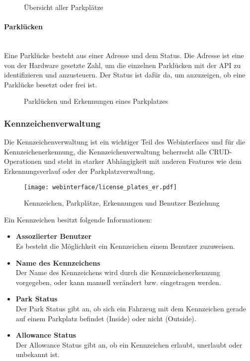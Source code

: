 \begin{figure}[H]
  \centering
  \caption{Übersicht aller Parkplätze}
\end{figure}

\paragraph{Parklücken}\mbox{}\\
Eine Parklücke besteht aus einer Adresse und dem Status. Die Adresse ist eine
von der Hardware gesetzte Zahl, um die einzelnen Parklücken mit der API zu
identifizieren und anzusteuern. Der Status ist dafür da, um anzuzeigen, ob eine Parklücke besetzt
oder frei ist.

\begin{figure}[H]
  \centering
  \caption{Parklücken und Erkennungen eines Parkplatzes}
\end{figure}

\subsubsection{Kennzeichenverwaltung}
Die Kennzeichenverwaltung ist ein wichtiger Teil des Webinterfaces und für die
Kennzeichenerkennung, die Kennzeichenverwaltung beherrscht alle CRUD-Operationen
und steht in starker Abhängigkeit mit anderen Features wie dem Erkennungsverlauf oder der
Parkplatzverwaltung. 

\begin{figure}[H]
  \centering
  \texttt{[image: webinterface/license\_plates\_er.pdf]}
  \caption{Kennzeichen, Parkplätze, Erkennungen und Benutzer Beziehung}
\end{figure}

Ein Kennzeichen besitzt folgende Informationen:

\begin{itemize}
  \item \textbf{Assoziierter Benutzer}\\
  Es besteht die Möglichkeit ein Kennzeichen einem Benutzer zuzuweisen.
  \item \textbf{Name des Kennzeichens}\\
  Der Name des Kennzeichens wird durch die Kennzeichenerkennung vorgegeben, oder
  kann manuell verändert bzw. eingetragen werden.
  \\
  \item \textbf{Park Status} \\
  Der Park Status gibt an, ob sich ein Fahrzeug mit dem Kennzeichen gerade auf
  einem Parkplatz befindet (Inside) oder nicht (Outside).
  \item \textbf{Allowance Status} \\
  Der Allowance Status gibt an, ob ein Kennzeichen erlaubt, unerlaubt oder
  unbekannt ist.
\end{itemize}


